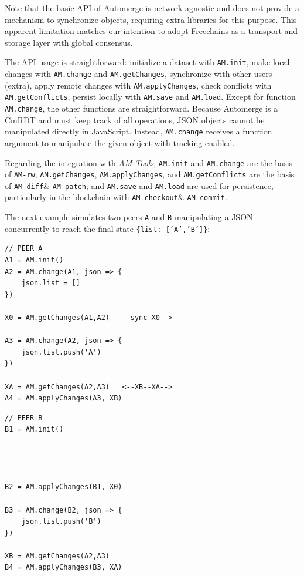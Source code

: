 \documentclass[12pt]{article}
\newcommand{\AMT}      {\emph{AM-Tools}\xspace}
\newcommand{\code}[1]  {\texttt{\footnotesize{#1}}}
\newcommand{\amrw}       {\texttt{AM-rw}\xspace}
\newcommand{\amdiff}     {\texttt{AM-diff}\xspace}
\newcommand{\ampatch}    {\texttt{AM-patch}\xspace}
\newcommand{\amcheckout} {\texttt{AM-checkout}\xspace}
\newcommand{\amcommit}   {\texttt{AM-commit}\xspace}
\begin{document}
Note that the basic API of Automerge is network agnostic and does not provide
a mechanism to synchronize objects, requiring extra libraries for this purpose.
%
This apparent limitation matches our intention to adopt Freechains as a
transport and storage layer with global consensus.

The API usage is straightforward:
    initialize a dataset with \code{AM.init},
    make local changes with \code{AM.change} and \code{AM.getChanges},
    synchronize with other users (extra),
    apply remote changes with \code{AM.applyChanges},
    check conflicts with \code{AM.getConflicts},
    persist locally with \code{AM.save} and \code{AM.load}.
Except for function \code{AM.change}, the other functions are straightforward.
%
Because Automerge is a CmRDT and must keep track of all operations, JSON
objects cannot be manipulated directly in JavaScript.
Instead, \code{AM.change} receives a function argument to manipulate
the given object with tracking enabled.

Regarding the integration with \AMT,
    \code{AM.init} and \code{AM.change} are the basis of \amrw;
    \code{AM.getChanges}, \code{AM.applyChanges}, and \code{AM.getConflicts}
    are the basis of \amdiff \& \ampatch; and
    \code{AM.save} and \code{AM.load} are used for persistence, particularly in
    the blockchain with \amcheckout \& \amcommit.

The next example simulates two peers \code{A} and \code{B} manipulating a
JSON concurrently to reach the final state \code{\{list:~['A','B']\}}:

\noindent
{\footnotesize
\begin{minipage}[t]{0.6\textwidth}
\begin{verbatim}
// PEER A
A1 = AM.init()
A2 = AM.change(A1, json => {
    json.list = []
})

X0 = AM.getChanges(A1,A2)   --sync-X0-->

A3 = AM.change(A2, json => {
    json.list.push('A')
})

XA = AM.getChanges(A2,A3)   <--XB--XA-->
A4 = AM.applyChanges(A3, XB)
\end{verbatim}
\end{minipage}
\begin{minipage}[t]{0.4\textwidth}
\begin{verbatim}
// PEER B
B1 = AM.init()




B2 = AM.applyChanges(B1, X0)

B3 = AM.change(B2, json => {
    json.list.push('B')
})

XB = AM.getChanges(A2,A3)
B4 = AM.applyChanges(B3, XA)
\end{verbatim}
\end{minipage}
}
\end{document}
